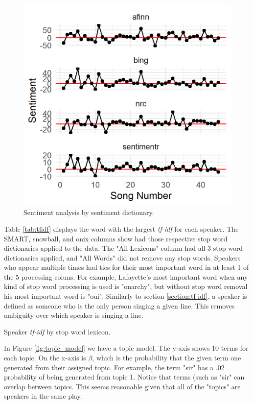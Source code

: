 \documentclass{article}
\begin{document}
\begin{figure}[h]
    \caption{Sentiment analysis by sentiment dictionary. \label{fig:sentiment}}
    \centering
    \includegraphics[width=0.5\paperwidth, scale=1]{sentiment_by_stopwords.png}
\end{figure}

Table \ref{tab:tfidf} displays the word with the largest \emph{tf-idf} for each speaker. The SMART, snowball, and onix columns show had those respective stop word dictionaries applied to the data. The "All Lexicons" column had all 3 stop word dictionaries applied, and "All Words" did not remove any stop words. Speakers who appear multiple times had ties for their most important word in at least 1 of the 5 processing coluns. For example, Lafayette's most important word when any kind of stop word processing is used is "onarchy", but without stop word removal his most important word is "oui". Similarly to section \ref{section:tf-idf}, a speaker is defined as someone who is the only person singing a given line. This removes ambiguity over which speaker is singing a line. 

\begin{table}
\caption{Speaker \emph{tf-idf} by stop word lexicon.}
\label{tab:tfidf}

\end{table}

In Figure \ref{fig:topic_model} we have a topic model. The y-axis shows 10 terms for each topic. On the x-axis is $\beta$, which is the probability that the given term one generated from their assigned topic. For example, the term "sir" has a .02 probability of being generated from topic 1. Notice that terms (such as "sir" can overlap between topics. This seems reasonable given that all of the "topics" are speakers in the same play.
\end{document}
